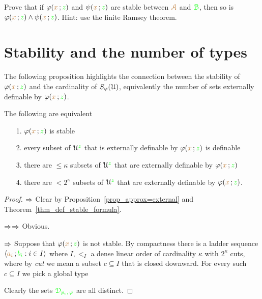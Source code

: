  \begin{exercise}\label{ex_stability_conjunction}
    Prove that if $\varphi({\color{brown} x}\,;{\color{green} z})$ and $\psi({\color{brown} x}\,;{\color{green} z})$ are stable between ${\color{brown}\EuScript A}$ and ${\color{green}\EuScript B}$, then so is $\varphi({\color{brown} x}\,;{\color{green} z})\wedge\psi({\color{brown} x}\,;{\color{green} z})$.
    Hint: use the finite Ramsey theorem.
  \end{exercise}

\section{Stability and the number of types}


The following proposition highlights the connection between the stability of $\varphi({\color{brown} x}\,;{\color{green} z})$ and the cardinality of $S_\varphi(\EuScript U)$, equivalently the number of sets externally definable by $\varphi({\color{brown} x}\,;{\color{green} z})$. 

\begin{theorem}\label{thm_def_stable_formula2}
   The following are equivalent
   \begin{itemize}
     \item[1.] $\varphi({\color{brown} x}\,;{\color{green} z})$ is stable
     \item[2.] every subset of $\EuScript U^{\color{green} z}$ that is externally definable by $\varphi({\color{brown} x}\,;{\color{green} z})$ is definable
     \item[3.] there are $\le\kappa$ subsets of $\EuScript U^{\color{green} z}$ that are externally definable by $\varphi({\color{brown} x}\,;{\color{green} z})$
     \item[4.] there are $<2^\kappa$ subsets of $\EuScript U^{\color{green} z}$ that are externally definable by $\varphi({\color{brown} x}\,;{\color{green} z})$.
   \end{itemize}
 \end{theorem}
 
 \begin{proof}
 $\Rightarrow$ Clear by Proposition~\ref{prop_approx=external} and Theorem~\ref{thm_def_stable_formula}.
 
 $\Rightarrow$$\Rightarrow$ Obvious.
 
 $\Rightarrow$ Suppose that $\varphi({\color{brown} x}\,;{\color{green} z})$ is not stable.
 By compactness there is a ladder sequence  $\langle{\color{brown}a_i}\,;{\color{green} b_i} : i\in I\rangle$ where $I,<_I$ a dense linear order of cardinality $\kappa$ with $2^\kappa$ cuts, where by \textit{cut\/} we mean a subset $c\subseteq I$ that is closed downward.
 For every such $c\subseteq I$ we pick a global type
 
 
 Clearly the sets ${\color{green}\EuScript D_{p_c,\,\varphi} }$ are all distinct.
 \end{proof}


